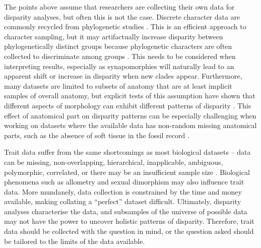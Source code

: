 \documentclass[12pt,letterpaper]{article}
\begin{document}
The points above assume that researchers are collecting their own data for disparity analyses, but often this is not the case.
Discrete character data are commonly recycled from phylogenetic studies \citep[][e.g]{Foote1989-fd, Deline2018-le}.
This is an efficient approach to character sampling, but it may artifactually increase disparity between phylogenetically distinct groups because phylogenetic characters are often collected to discriminate among groups \citep{Foote1995-do}.
This needs to be considered when interpreting results, especially as synapomorphies will naturally lead to an apparent shift or increase in disparity when new clades appear.
Furthermore, many datasets are limited to subsets of anatomy that are at least implicit samples of overall anatomy, but explicit tests of this assumption have shown that different aspects of morphology can exhibit different patterns of disparity \citep{Hopkins2017-cf}.
This effect of anatomical part on disparity patterns can be especially challenging when working on datasets where the available data has non-random missing anatomical parts, such as the absence of soft tissue in the fossil record \citep{Deline2018-le}.

Trait data suffer from the same shortcomings as most biological datasets -- data can be missing, non-overlapping, hierarchical, inapplicable, ambiguous, polymorphic, correlated, or there may be an insufficient sample size \citep{Brazeau2017-kg, Palci2018-ni}.
Biological phenomena such as allometry and sexual dimorphism may also influence trait data.
More mundanely, data collection is constrained by the time and money available, making collating a ``perfect'' dataset difficult.
Ultimately, disparity analyses characterise the data, and subsamples of the universe of possible data may not have the power to uncover holistic patterns of disparity.
Therefore, trait data should be collected with the question in mind, or the question asked should be tailored to the limits of the data available.

\end{document}
